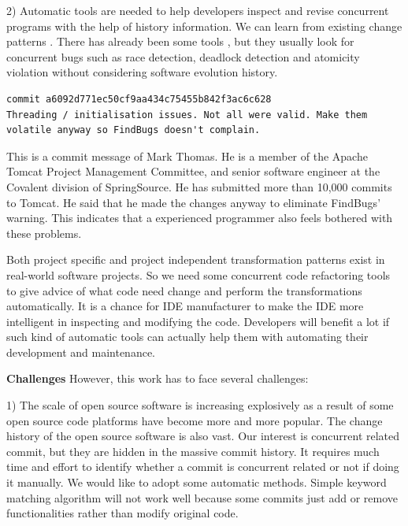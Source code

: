 \documentclass[conference]{IEEEtran}
\begin{document}

2) Automatic tools are needed to help developers inspect and revise concurrent programs with the help of history information. We can learn from existing change patterns \cite{conf/pldi/MengKM11}. There has already been some tools \cite{conf/ppopp/SamakR14, conf/sigsoft/EslamimehrP14, conf/pldi/BiswasHSB14}, but they usually look for concurrent bugs such as race detection, deadlock detection and atomicity violation without considering software evolution history.

\lstset{numbers=left, breaklines=true,  basicstyle=\ttfamily\tiny,  xleftmargin=3em, tabsize=2}
\begin{lstlisting}
commit a6092d771ec50cf9aa434c75455b842f3ac6c628
Threading / initialisation issues. Not all were valid. Make them volatile anyway so FindBugs doesn't complain.
\end{lstlisting}

This is a commit message of Mark Thomas. He is a member of the Apache Tomcat Project Management Committee, and senior software engineer at the Covalent division of SpringSource. He has submitted more than 10,000 commits to Tomcat. He said that he made the changes anyway to eliminate FindBugs' warning. This indicates that a experienced programmer also feels bothered with these problems.

Both project specific and project independent transformation patterns exist in real-world software projects. So we need some concurrent code refactoring tools to give advice of what code need change and perform the transformations automatically. It is a chance for IDE manufacturer to make the IDE more intelligent in inspecting and modifying the code. Developers will benefit a lot if such kind of automatic tools can actually help them with automating their development and maintenance.

\textbf{Challenges} However, this work has to face several challenges:

1) The scale of open source software is increasing explosively as a result of some open source code platforms have become more and more popular. The change history of the open source software is also vast. Our interest is concurrent related commit, but they are hidden in the massive commit history. It requires much time and effort to identify whether a commit is concurrent related or not if doing it manually. We would like to adopt some automatic methods. Simple keyword matching algorithm will not work well because some commits just add or remove functionalities rather than modify original code.
\end{document}
